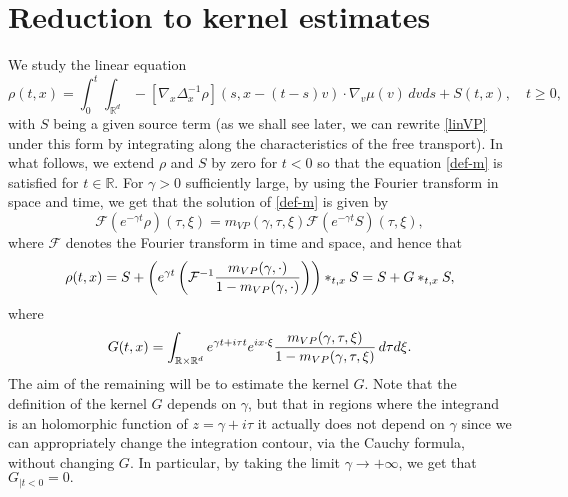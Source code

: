 \documentclass[11pt]{amsart}
\numberwithin{equation}{section}
\newcommand{\R}{\mathbb{R}}
\newcommand{\na}{\nabla}
\begin{document}
\section{Reduction to kernel estimates}
We study the linear equation
\begin{equation}\label{def-m}
\rho(t,x) = \int_0^t \int_{\R^d}  -  [\na_x  \Delta_x^{-1} \rho](s,x -(t-s)v) \cdot \na_v \mu(v) \, dv ds + S(t,x), \quad t \geq 0,
\end{equation}
with $S$ being a given source term (as we shall see later,  we can rewrite \eqref{linVP} under this form by integrating along
 the characteristics of the free transport).  In what follows, we extend $\rho$ and $S$ by zero for $t<0 $ so that the equation \eqref{def-m}
is satisfied for $t \in \mathbb{R}$. 
For $\gamma >0$ sufficiently large, by using the Fourier transform in space and time, we get that the solution of \eqref{def-m}
is given by 
$$  \mathcal{F}(e^{-\gamma t } \rho) (\tau, \xi) =  m_{VP}(\gamma, \tau, \xi)   \mathcal{F}(e^{-\gamma t} S)(\tau, \xi),$$
where $\mathcal{F}$ denotes the Fourier transform in time and space,
 and hence that
 \begin{equation}
 \label{eqrho} \rho(t,x) =  S +  \left( e^{\gamma  t }\left( \mathcal{F}^{-1} {  m_{VP}(\gamma, \cdot) \over 1 - m_{VP}(\gamma, \cdot)} \right)\right)*_{t, x} S = S+ G*_{t,x}S,
 \end{equation}
where 
 \begin{equation}
 \label{Gdef}G(t,x) = \int_{\mathbb{R} \times \mathbb{R}^d} e^{ \gamma t + i \tau t} e^{i x \cdot \xi}
   {  m_{VP}(\gamma, \tau, \xi) \over 1 - m_{VP}(\gamma, \tau, \xi)}\, d\tau d\xi.
   \end{equation}
The aim of the remaining will be to estimate the kernel $G$. Note that the definition of the kernel  $G$ depends on $\gamma$, but that in regions
where the integrand is an holomorphic function of $z= \gamma + i \tau$ it actually does not depend on $\gamma$ since  we can appropriately change the integration contour, via the Cauchy formula, without
 changing $G$. In particular, by taking the limit $\gamma \rightarrow + \infty$, we get that $G_{|t<0}=0.$
 
 
 
\end{document}
